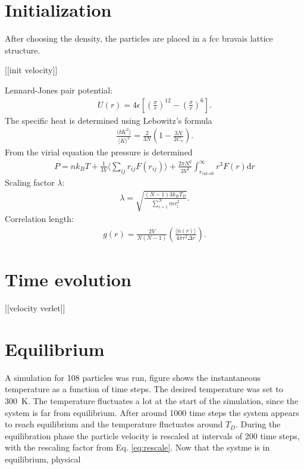 \section{Initialization}
After choosing the density, the particles are placed in a fcc bravais lattice structure.

[[init velocity]]

Lennard-Jones pair potential:
\begin{gather*}
    U(r) = 4\epsilon\left[\left(\frac{\sigma}{r}\right)^{12}-\left(\frac{\sigma}{r}\right)^6\right].
\end{gather*}
The specific heat is determined using Lebowitz's formula \cite{cite:jos}
\begin{gather*}
    \frac{\langle \delta K^2\rangle}{\langle K\rangle^2}=\frac{2}{3N}\left( 1-\frac{3N}{2C_v}\right).
\end{gather*}
From the virial equation the pressure is determined 
\begin{gather*}
    P = nk_BT + \frac{1}{3V}\Big \langle \sum_{ij} r_{ij}F(r_{ij})\Big \rangle + \frac{2\pi N^2}{3V^2}\int_{r_{\text{cut-off}}}^{\infty}r^3 F(r) \text{d}r
\end{gather*}
Scaling factor $\lambda$:
\begin{gather}\label{eq:rescale}
    \lambda=\sqrt{\frac{(N-1)3k_BT_D}{\sum_{i=1}^{N} mv_i^{2}}}.
\end{gather}
Correlation length:
\begin{gather*}
    g(r)=\frac{2V}{N(N-1)}\left(\frac{\langle n(r)\rangle}{4\pi r^2\Delta r}\right).
\end{gather*}

\section{Time evolution}
[[velocity verlet]]

\section{Equilibrium}
A simulation for 108 particles was run, figure %
shows the instantaneous temperature as a function of time steps. The desired temperature was set to 300~K. The temperature fluctuates a lot at the start of the simulation, since the system is far from equilibrium. After around 1000 time steps the system appears to reach equilibrium and the temperature fluctuates around $T_D$. During the equilibration phase the particle velocity is rescaled at intervals of 200 time steps, with the rescaling factor from Eq. \ref{eq:rescale}. Now that the systme is in equilibrium, physical 